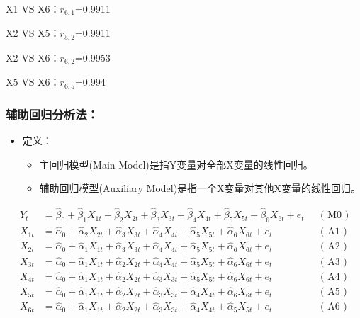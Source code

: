 \documentclass[12pt,(landscape,a4paper),(portrait,a4paper)]{article}
\providecommand{\tightlist}{%
  \setlength{\itemsep}{0pt}\setlength{\parskip}{0pt}}
\begin{document}
X1 VS X6：\(r_{6,1}\)=0.9911

X2 VS X5：\(r_{5,2}\)=0.9911

X2 VS X6：\(r_{6,2}\)=0.9953

X5 VS X6：\(r_{6,5}\)=0.994

\subsubsection{辅助回归分析法：}

\begin{itemize}
\tightlist
\item
  定义：

  \begin{itemize}
  \tightlist
  \item
    主回归模型(Main Model)是指Y变量对全部X变量的线性回归。
  \item
    辅助回归模型(Auxiliary Model)是指一个X变量对其他X变量的线性回归。
  \end{itemize}
\end{itemize}

\begin{align}
Y_t & = \hat{\beta}_0+\hat{\beta}_1X_{1t}+\hat{\beta}_2X_{2t}+\hat{\beta}_3X_{3t}+\hat{\beta}_4X_{4t}+\hat{\beta}_5X_{5t}+\hat{\beta}_6X_{6t}+e_{t} && \text{( M0 )} \label{eq:M0} \\
X_{1t}& = \hat{\alpha}_0+\hat{\alpha}_2X_{2t}+\hat{\alpha}_3X_{3t}+\hat{\alpha}_4X_{4t}+\hat{\alpha}_5X_{5t}+\hat{\alpha}_6X_{6t}+e_{t} && \text{( A1 )} \label{eq:A1} \\
X_{2t}& = \hat{\alpha}_0+\hat{\alpha}_1X_{1t}+\hat{\alpha}_3X_{3t}+\hat{\alpha}_4X_{4t}+\hat{\alpha}_5X_{5t}+\hat{\alpha}_6X_{6t}+e_{t} && \text{( A2 )} \label{eq:A2} \\
X_{3t}& = \hat{\alpha}_0+\hat{\alpha}_1X_{1t}+\hat{\alpha}_2X_{2t}+\hat{\alpha}_4X_{4t}+\hat{\alpha}_5X_{5t}+\hat{\alpha}_6X_{6t}+e_{t} && \text{( A3 )} \label{eq:A3} \\
X_{4t}& = \hat{\alpha}_0+\hat{\alpha}_1X_{1t}+\hat{\alpha}_2X_{2t}+\hat{\alpha}_3X_{3t}+\hat{\alpha}_5X_{5t}+\hat{\alpha}_6X_{6t}+e_{t} && \text{( A4 )} \label{eq:A4} \\
X_{5t}& = \hat{\alpha}_0+\hat{\alpha}_1X_{1t}+\hat{\alpha}_2X_{2t}+\hat{\alpha}_3X_{3t}+\hat{\alpha}_4X_{4t}+\hat{\alpha}_6X_{6t}+e_{t} && \text{( A5 )} \label{eq:A5} \\
X_{6t}& = \hat{\alpha}_0+\hat{\alpha}_1X_{1t}+\hat{\alpha}_2X_{2t}+\hat{\alpha}_3X_{3t}+\hat{\alpha}_4X_{4t}+\hat{\alpha}_5X_{5t}+e_{t} && \text{( A6 )} \label{eq:A6} 
\end{align}
\end{document}
